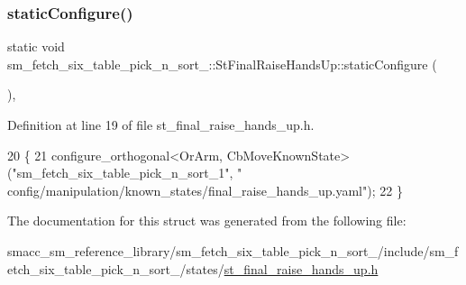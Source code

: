 \subsubsection{\texorpdfstring{static\+Configure()}{staticConfigure()}}
{\footnotesize\ttfamily static void sm\+\_\+fetch\+\_\+six\+\_\+table\+\_\+pick\+\_\+n\+\_\+sort\+\_\+::\+St\+Final\+Raise\+Hands\+Up\+::static\+Configure (\begin{DoxyParamCaption}{ }\end{DoxyParamCaption})\hspace{0.3cm}{\ttfamily [inline]}, {\ttfamily [static]}}



Definition at line 19 of file st\+\_\+final\+\_\+raise\+\_\+hands\+\_\+up.\+h.


\begin{DoxyCode}
20     \{
21         configure\_orthogonal<OrArm, CbMoveKnownState>(\textcolor{stringliteral}{"sm\_fetch\_six\_table\_pick\_n\_sort\_1"}, \textcolor{stringliteral}{"
      config/manipulation/known\_states/final\_raise\_hands\_up.yaml"});
22     \}
\end{DoxyCode}


The documentation for this struct was generated from the following file\+:\begin{DoxyCompactItemize}
\item 
smacc\+\_\+sm\+\_\+reference\+\_\+library/sm\+\_\+fetch\+\_\+six\+\_\+table\+\_\+pick\+\_\+n\+\_\+sort\+\_/include/sm\+\_\+fetch\+\_\+six\+\_\+table\+\_\+pick\+\_\+n\+\_\+sort\+\_/states/\hyperlink{sm__fetch__six__table__pick__n__sort__1_2include_2sm__fetch__six__table__pick__n__sort__1_2state391b644bd58a58ea54a4093482402d0f}{st\+\_\+final\+\_\+raise\+\_\+hands\+\_\+up.\+h}\end{DoxyCompactItemize}
